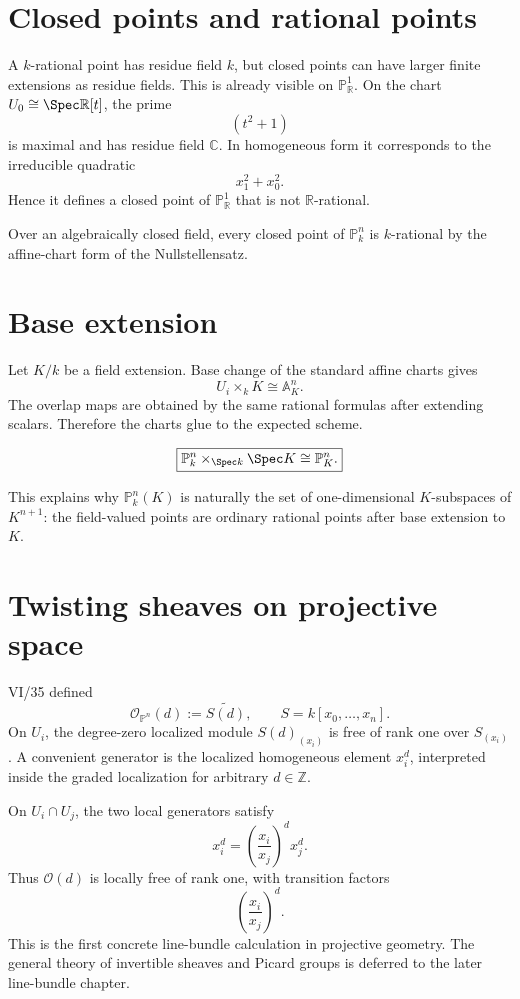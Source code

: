 \section{Closed points and rational points}
A \(k\)-rational point has residue field \(k\), but closed points can have larger finite extensions as residue fields.  This is already visible on \(\mathbb P^1_{\mathbb R}\).  On the chart \(U_0\cong\Spec\mathbb R[t]\), the prime
\[
(t^2+1)
\]
is maximal and has residue field \(\mathbb C\).  In homogeneous form it corresponds to the irreducible quadratic
\[
x_1^2+x_0^2.
\]
Hence it defines a closed point of \(\mathbb P^1_{\mathbb R}\) that is not \(\mathbb R\)-rational.

Over an algebraically closed field, every closed point of \(\mathbb P^n_k\) is \(k\)-rational by the affine-chart form of the Nullstellensatz.

\section{Base extension}
Let \(K/k\) be a field extension.  Base change of the standard affine charts gives
\[
U_i\times_k K\cong\mathbb A^n_K.
\]
The overlap maps are obtained by the same rational formulas after extending scalars.  Therefore the charts glue to the expected scheme.

\begin{theorem}\label{thm:vi36-base-change}
\[
\boxed{\mathbb P^n_k\times_{\Spec k}\Spec K\cong\mathbb P^n_K.}
\]
\end{theorem}

This explains why \(\mathbb P^n_k(K)\) is naturally the set of one-dimensional \(K\)-subspaces of \(K^{n+1}\): the field-valued points are ordinary rational points after base extension to \(K\).

\section{Twisting sheaves on projective space}
VI/35 defined
\[
\mathcal O_{\mathbb P^n}(d):=\widetilde{S(d)},
\qquad S=k[x_0,\ldots,x_n].
\]
On \(U_i\), the degree-zero localized module \(S(d)_{(x_i)}\) is free of rank one over \(S_{(x_i)}\).  A convenient generator is the localized homogeneous element \(x_i^d\), interpreted inside the graded localization for arbitrary \(d\in\mathbb Z\).

On \(U_i\cap U_j\), the two local generators satisfy
\[
x_i^d=\left(\frac{x_i}{x_j}\right)^d x_j^d.
\]
Thus \(\mathcal O(d)\) is locally free of rank one, with transition factors
\[
\left(\frac{x_i}{x_j}\right)^d.
\]
This is the first concrete line-bundle calculation in projective geometry.  The general theory of invertible sheaves and Picard groups is deferred to the later line-bundle chapter.

